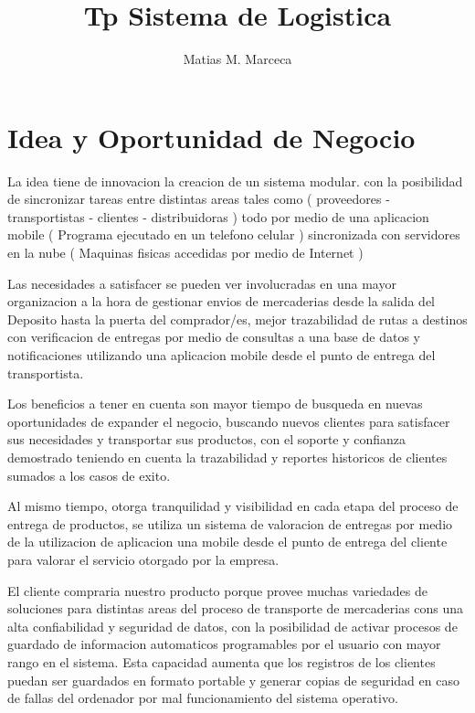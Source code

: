 \documentclass[
10pt, %
a4paper, %
oneside, %
headinclude,footinclude, %
BCOR5mm, %
]{scrartcl}
\title{Tp Sistema de Logistica}
\author{Matias M. Marceca}
\date{}
\begin{document}
\maketitle

\tableofcontents

\pagebreak

\section{Idea y Oportunidad de Negocio}

La idea tiene de innovacion la creacion de un sistema modular.
con la posibilidad de sincronizar tareas entre distintas areas
tales como ( proveedores - transportistas - clientes - distribuidoras )
todo por medio de una aplicacion mobile ( Programa ejecutado en un telefono
celular ) sincronizada con servidores en la nube ( Maquinas fisicas accedidas
por medio de Internet )

Las necesidades a satisfacer se pueden ver involucradas en una  mayor
organizacion a la hora de gestionar envios de mercaderias desde la salida
del Deposito hasta la puerta del comprador/es,  mejor trazabilidad de
rutas a destinos con verificacion de entregas por medio de consultas a una
base de datos y notificaciones utilizando una aplicacion mobile desde el
punto de entrega del transportista.

Los beneficios a tener en cuenta son mayor tiempo de busqueda en nuevas
oportunidades de expander el negocio, buscando nuevos clientes para satisfacer
sus necesidades y transportar sus productos, con el soporte y confianza demostrado
teniendo en cuenta la trazabilidad y reportes historicos de clientes sumados
a los casos de exito.

Al mismo tiempo, otorga tranquilidad y visibilidad en cada etapa del
proceso de entrega de productos, se utiliza un sistema de valoracion de
entregas por medio de la utilizacion de aplicacion una mobile desde el
punto de entrega del cliente para valorar el servicio otorgado por la empresa.

El cliente compraria nuestro producto porque provee muchas variedades de
soluciones para distintas areas del proceso de transporte de mercaderias cons
una alta confiabilidad y seguridad de datos, con la posibilidad de activar
procesos de guardado de informacion automaticos programables por el usuario
con mayor rango en el sistema. Esta capacidad aumenta que los registros
de los clientes puedan ser guardados en formato portable y generar copias de
seguridad en caso de fallas del ordenador por mal funcionamiento del
sistema operativo.
\end{document}
